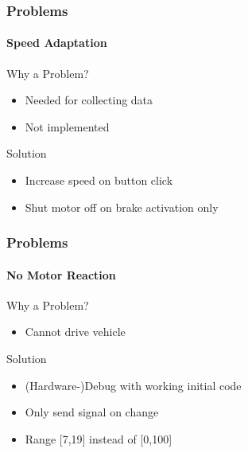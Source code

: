 \documentclass[8pt]{beamer}
\begin{document}
\begin{frame}
	\frametitle{Problems}
	\framesubtitle{Speed Adaptation}
	\begin{block}{Why a Problem?}
		\begin{itemize}
			\item Needed for collecting data
			\item Not implemented
		\end{itemize}
	\end{block}
	\begin{block}{Solution}
		\begin{itemize}
			\item Increase speed on button click
			\item Shut motor off on brake activation only
		\end{itemize}
	\end{block}	
\end{frame}

\begin{frame}
	\frametitle{Problems}
	\framesubtitle{No Motor Reaction}
	\begin{block}{Why a Problem?}
		\begin{itemize}
			\item Cannot drive vehicle
		\end{itemize}
	\end{block}
	\begin{block}{Solution}
		\begin{itemize}
			\item (Hardware-)Debug with working initial code
			\item Only send signal on change
			\item Range [7,19] instead of [0,100]
		\end{itemize}
	\end{block}	
\end{frame}
\end{document}
